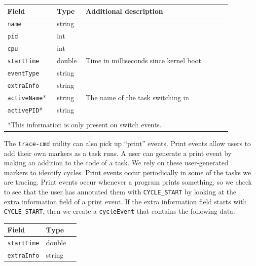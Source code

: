\documentclass{hmcclinic}
\begin{document}
  \begin{center}
    \begin{tabular}{p{0.2\linewidth}p{0.1\linewidth}p{0.6\linewidth}}
      \toprule
      \textbf{Field}     & \textbf{Type}   & \textbf{Additional description}                 \\
      \midrule
       \texttt{name}      & string &                                        \\
       \texttt{pid}       & int    &                                        \\
       \texttt{cpu}       & int    &                                        \\
       \texttt{startTime} & double & Time in milliseconds since kernel boot \\
       \texttt{eventType} & string &                                        \\
      \texttt{extraInfo} & string &                                        \\
       \texttt{activeName}* & string & The name of the task switching in      \\
       \texttt{activePID}*  & string &                                        \\
      \bottomrule\\
\multicolumn{3}{l}{ *This information is only present on switch events.}
    \end{tabular}
  \end{center}

 

  The \texttt{trace-cmd} utility can also pick up ``print'' events. Print events allow users to add
  their own markers as a task runs. A user can generate a print event by making
  an addition to the code of a task. We rely on these user-generated markers to
  identify cycles. Print events occur periodically in some of the tasks we are
  tracing. Print events occur whenever a program prints something, so we check to see
  that the user has annotated them with \texttt{CYCLE\_START} by looking at the extra
  information field of a print event. If the extra information field starts with
  \texttt{CYCLE\_START}, then we create a \texttt{cycleEvent} that contains the following data.

  \begin{center}
    \begin{tabular}{lll}
      \toprule
      \textbf{Field}     & \textbf{Type}                \\
      \midrule
       \texttt{startTime}      & double                               \\
       \texttt{extraInfo}       & string                              \\
      \bottomrule
    \end{tabular}
  \end{center}
\end{document}
